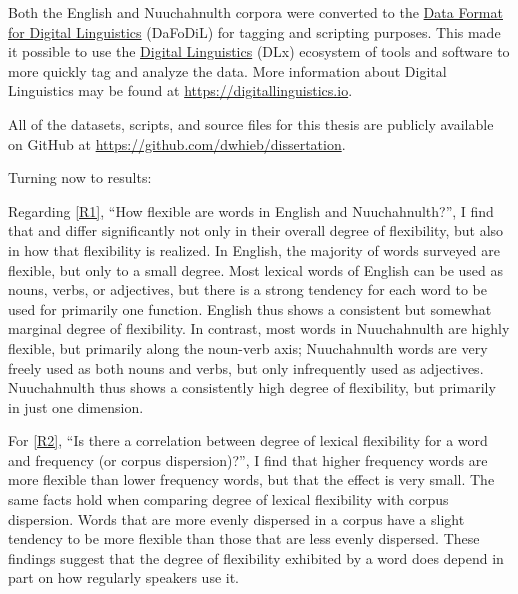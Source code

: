 Both the English and Nuuchahnulth corpora were converted to the \href{https://format.digitallinguistics.io}{Data Format for Digital Linguistics} (DaFoDiL)  for tagging and scripting purposes. This made it possible to use the \href{https://digitallinguistics.io}{Digital Linguistics} (DLx) ecosystem of tools and software to more quickly tag and analyze the data. More information about Digital Linguistics may be found at \url{https://digitallinguistics.io}.

All of the datasets, scripts, and source files for this thesis are publicly available on GitHub at \url{https://github.com/dwhieb/dissertation}.

Turning now to results:

Regarding \ref{R1}, \enquote{How flexible are words in English and Nuuchahnulth?}, I find that  and  differ significantly not only in their overall degree of flexibility, but also in how that flexibility is realized. In English, the majority of words surveyed are flexible, but only to a small degree. Most lexical words of English can be used as nouns, verbs, or adjectives, but there is a strong tendency for each word to be used for primarily one function. English thus shows a consistent but somewhat marginal degree of flexibility. In contrast, most words in Nuuchahnulth are highly flexible, but primarily along the noun-verb axis; Nuuchahnulth words are very freely used as both nouns and verbs, but only infrequently used as adjectives. Nuuchahnulth thus shows a consistently high degree of flexibility, but primarily in just one dimension.

For \ref{R2}, \enquote{Is there a correlation between degree of lexical flexibility for a word and frequency (or corpus dispersion)?}, I find that higher frequency words are more flexible than lower frequency words, but that the effect is very small. The same facts hold when comparing degree of lexical flexibility with corpus dispersion. Words that are more evenly dispersed in a corpus have a slight tendency to be more flexible than those that are less evenly dispersed. These findings suggest that the degree of flexibility exhibited by a word does depend in part on how regularly speakers use it.

